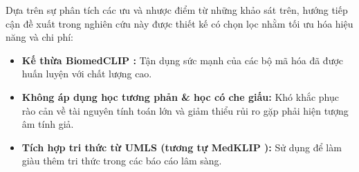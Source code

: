   Dựa trên sự phân tích các ưu và nhược điểm từ những khảo sát trên, hướng tiếp cận đề xuất trong nghiên cứu này được thiết kế có chọn lọc nhằm tối ưu hóa hiệu năng và chi phí:
  \begin{itemize}
      \item \textbf{Kế thừa BiomedCLIP \cite{BiomedCLIP}:} Tận dụng sức mạnh của các bộ mã hóa đã được huấn luyện với chất lượng cao.
      \item \textbf{Không áp dụng học tương phản \& học có che giấu:} Khó khắc phục rào cản về tài nguyên tính toán lớn và giảm thiểu rủi ro gặp phải hiện tượng âm tính giả.
      \item \textbf{Tích hợp tri thức từ UMLS (tương tự MedKLIP \cite{MedKLIP}):} Sử dụng để làm giàu thêm tri thức trong các báo cáo lâm sàng.
  \end{itemize}

